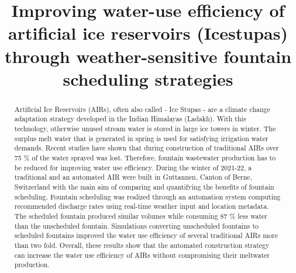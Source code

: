\documentclass[tc, manuscript]{copernicus}
\begin{document}
\title{Improving water-use efficiency of artificial ice reservoirs (Icestupas) through weather-sensitive fountain scheduling
strategies}

\def\Authors{Suryanarayanan Balasubramanian\,$^{1,2}$, Martin Hoelzle\,$^{1}$Roger Waser\,$^{3}$}

\def\Address{$^{1}$University of Fribourg, Department of Geosciences, Fribourg, Switzerland $^{2}$University of
Applied Sciences and Arts, Luzern, Switzerland} \def\corrAuthor{Suryanarayanan Balasubramanian}





\maketitle

\begin{abstract}

  Artificial Ice Reservoirs (AIRs), often also called - Ice Stupas - are a climate change adaptation strategy
  developed in the Indian Himalayas (Ladakh). With this technology, otherwise unused stream water is stored in
  large ice towers in winter. The surplus melt water that is generated in spring is used for satisfying
  irrigation water demands. Recent studies have shown that during construction of traditional AIRs over 75 \% of
  the water sprayed was lost. Therefore, fountain wastewater production has to be reduced for improving water
  use efficiency.  During the winter of 2021-22, a traditional and an automated AIR were built in Guttannen,
  Canton of Berne, Switzerland with the main aim of comparing and quantifying the benefits of fountain
  scheduling. Fountain scheduling was realized through an automation system computing recommended discharge
  rates using real-time weather input and location metadata. The scheduled fountain produced similar volumes
  while consuming 87 \% less water than the unscheduled fountain. Simulations converting unscheduled fountains
  to scheduled fountains improved the water use efficiency of several traditional AIRs more than two fold.
  Overall, these results show that the automated construction strategy can increase the water use efficiency of
  AIRs without compromising their meltwater production.

\end{abstract}
\end{document}
